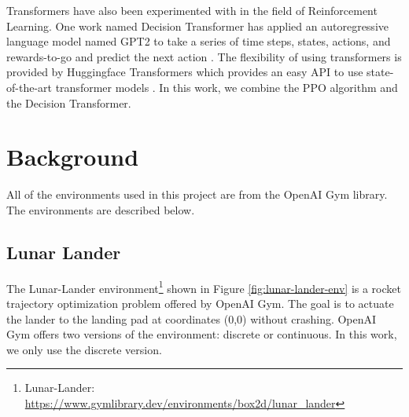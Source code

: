 Transformers have also been experimented with in the field of Reinforcement Learning. One work named Decision Transformer has applied an autoregressive language model named GPT2 to take a series of
time steps, states, actions, and rewards-to-go and predict the next action \cite{radford2019language,chen2021decision}. The flexibility of using transformers is provided by Huggingface Transformers
which provides an easy API to use state-of-the-art transformer models \cite{wolf2019huggingface}.
In this work, we combine the PPO algorithm and the Decision Transformer.


\section{Background}

All of the environments used in this project are from the OpenAI Gym library\cite{brockman2016openai}. The environments are described below.

\subsection{Lunar Lander}

The Lunar-Lander environment\footnote{ Lunar-Lander: \url{https://www.gymlibrary.dev/environments/box2d/lunar_lander}} shown in Figure \ref{fig:lunar-lander-env} is a rocket trajectory optimization problem offered by OpenAI Gym. The goal is to actuate the lander to the landing pad at coordinates (0,0) without crashing. OpenAI Gym offers two versions of the environment: discrete or continuous. In this work, we only use the discrete version.

